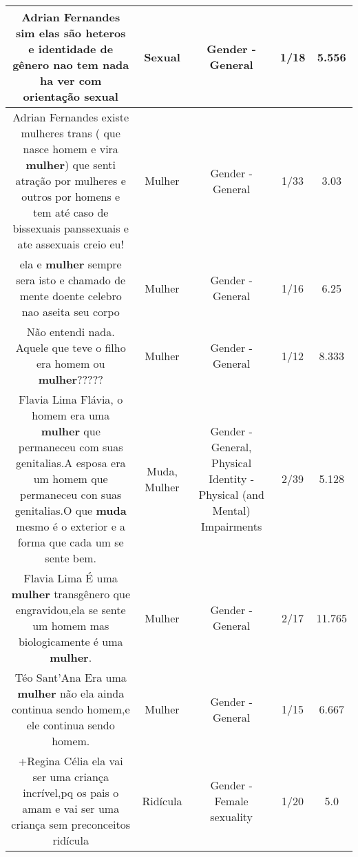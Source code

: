 \documentclass[11pt]{article}
\newlength\mylength
\begin{document}
\begin{center}
\begin{longtable}{|C{.65\mylength}|C{.30\mylength}|C{.12\mylength}|C{.12\mylength}|C{.12\mylength}|}
  \small Adrian Fernandes  sim elas são heteros e identidade de gênero nao tem nada ha ver com orientação sexual\normalsize   & Sexual & Gender - General & 1/18 & 5.556 \\  \hline
  \small Adrian Fernandes  existe mulheres trans ( que nasce homem e vira \textbf{mulher}) que senti atração por mulheres e outros por homens e tem até caso de bissexuais panssexuais  e ate assexuais creio eu!\normalsize   & Mulher & Gender - General & 1/33 & 3.03 \\  \hline
  \small ela   e  \textbf{mulher} sempre  sera   isto  e  chamado de   mente  doente   celebro  nao   aseita   seu  corpo\normalsize   & Mulher & Gender - General & 1/16 & 6.25 \\  \hline
  \small Não entendi nada. Aquele que teve o filho era homem ou \textbf{mulher}?????\normalsize   & Mulher & Gender - General & 1/12 & 8.333 \\  \hline
  \small Flavia Lima Flávia, o homem era uma \textbf{mulher} que permaneceu com suas genitalias.A esposa era um homem que permaneceu con suas genitalias.O que \textbf{muda} mesmo é o exterior e a forma que cada um se sente bem.\normalsize   & Muda, Mulher & Gender - General, Physical Identity - Physical (and Mental) Impairments & 2/39 & 5.128 \\  \hline
  \small Flavia Lima É uma \textbf{mulher} transgênero que engravidou,ela se sente um homem mas biologicamente é uma \textbf{mulher}.\normalsize   & Mulher & Gender - General & 2/17 & 11.765 \\  \hline
  \small Téo Sant'Ana Era uma \textbf{mulher} não ela ainda continua sendo homem,e ele continua sendo homem.\normalsize   & Mulher & Gender - General & 1/15 & 6.667 \\  \hline
  \small +Regina Célia ela vai ser uma criança incrível,pq os pais o amam e vai ser uma criança sem preconceitos ridícula\normalsize   & Ridícula & Gender - Female sexuality & 1/20 & 5.0 \\  \hline

\end{longtable}
\end{center}
\end{document}
